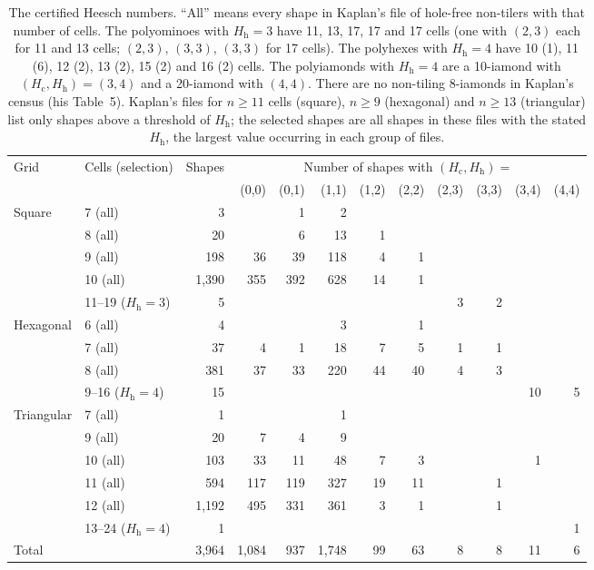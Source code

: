 \documentclass[10pt,a4paper]{article}
\theoremstyle{definition}
\theoremstyle{remark}
\newcommand{\Hc}{H_{\mathrm c}}
\newcommand{\Hh}{H_{\mathrm h}}
\begin{document}
\begin{table}[!htbp]
\centering\small
\setlength{\tabcolsep}{4.2pt}
\begin{tabular}{@{}llrrrrrrrrrr@{}}
\toprule
Grid & Cells (selection) & Shapes & \multicolumn{9}{c}{Number of shapes
with $(\Hc,\Hh)=$}\\
\cmidrule(l){4-12}
& & & (0,0) & (0,1) & (1,1) & (1,2) & (2,2) & (2,3) & (3,3) & (3,4) &
(4,4)\\
\midrule
Square & 7 (all) & 3 & & 1 & 2 & & & & & & \\
& 8 (all) & 20 & & 6 & 13 & 1 & & & & & \\
& 9 (all) & 198 & 36 & 39 & 118 & 4 & 1 & & & & \\
& 10 (all) & 1,390 & 355 & 392 & 628 & 14 & 1 & & & & \\
& 11--19 ($\Hh=3$) & 5 & & & & & & 3 & 2 & & \\
\midrule
Hexagonal & 6 (all) & 4 & & & 3 & & 1 & & & & \\
& 7 (all) & 37 & 4 & 1 & 18 & 7 & 5 & 1 & 1 & & \\
& 8 (all) & 381 & 37 & 33 & 220 & 44 & 40 & 4 & 3 & & \\
& 9--16 ($\Hh=4$) & 15 & & & & & & & & 10 & 5\\
\midrule
Triangular & 7 (all) & 1 & & & 1 & & & & & & \\
& 9 (all) & 20 & 7 & 4 & 9 & & & & & & \\
& 10 (all) & 103 & 33 & 11 & 48 & 7 & 3 & & & 1 & \\
& 11 (all) & 594 & 117 & 119 & 327 & 19 & 11 & & 1 & & \\
& 12 (all) & 1,192 & 495 & 331 & 361 & 3 & 1 & & 1 & & \\
& 13--24 ($\Hh=4$) & 1 & & & & & & & & & 1\\
\midrule
Total & & 3,964 & 1,084 & 937 & 1,748 & 99 & 63 & 8 & 8 & 11 & 6\\
\bottomrule
\end{tabular}
\caption{The certified Heesch numbers. ``All'' means every shape in
Kaplan's file of hole-free non-tilers with that number of cells. The polyominoes
with $\Hh=3$ have 11, 13, 17, 17 and 17 cells (one with $(2,3)$ each for
11 and 13 cells; $(2,3)$, $(3,3)$, $(3,3)$ for 17 cells). The polyhexes
with $\Hh=4$ have 10 (1), 11 (6), 12 (2), 13 (2), 15 (2) and 16 (2) cells.
The polyiamonds with $\Hh=4$ are a 10-iamond with $(\Hc,\Hh)=(3,4)$
and a 20-iamond with $(4,4)$. There are no non-tiling 8-iamonds in
Kaplan's census (his Table~5). Kaplan's files for
$n\geq11$ cells (square), $n\geq9$ (hexagonal) and $n\geq13$
(triangular) list only shapes above a threshold of $\Hh$; the selected
shapes are all shapes in these files with the stated $\Hh$, the largest
value occurring in each group of files.}
\label{tab:values}
\end{table}
\end{document}
